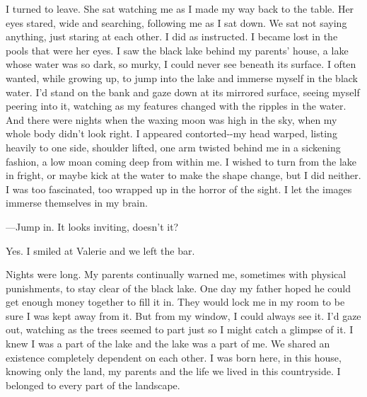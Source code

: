 I turned to leave. She sat watching me as I made my way back to the
table. Her eyes stared, wide and searching, following me as I sat down.
We sat not saying anything, just staring at each other. I did as
instructed. I became lost in the pools that were her eyes. I saw the
black lake behind my parents' house, a lake whose water was so dark, so
murky, I could never see beneath its surface. I often wanted, while
growing up, to jump into the lake and immerse myself in the black water.
I'd stand on the bank and gaze down at its mirrored surface, seeing
myself peering into it, watching as my features changed with the ripples
in the water. And there were nights when the waxing moon was high in the
sky, when my whole body didn't look right. I appeared contorted-\/-my
head warped, listing heavily to one side, shoulder lifted, one arm
twisted behind me in a sickening fashion, a low moan coming deep from
within me. I wished to turn from the lake in fright, or maybe kick at
the water to make the shape change, but I did neither. I was too
fascinated, too wrapped up in the horror of the sight. I let the images
immerse themselves in my brain.

---Jump in. It looks inviting, doesn't it?

Yes. I smiled at Valerie and we left the bar.

Nights were long. My parents continually warned me, sometimes with
physical punishments, to stay clear of the black lake. One day my father
hoped he could get enough money together to fill it in. They would lock
me in my room to be sure I was kept away from it. But from my window, I
could always see it. I'd gaze out, watching as the trees seemed to part
just so I might catch a glimpse of it. I knew I was a part of the lake
and the lake was a part of me. We shared an existence completely
dependent on each other. I was born here, in this house, knowing only
the land, my parents and the life we lived in this countryside. I
belonged to every part of the landscape.

